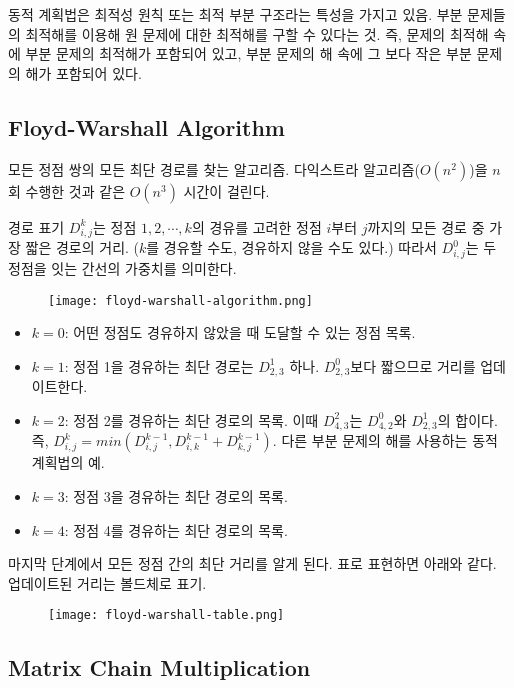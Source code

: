 동적 계획법은 최적성 원칙 또는 최적 부분 구조라는 특성을 가지고 있음. 부분 문제들의 최적해를 이용해 원 문제에 대한 최적해를 구할 수 있다는 것. 즉, 문제의 최적해 속에 부분 문제의 최적해가 포함되어 있고, 부분 문제의 해 속에 그 보다 작은 부분 문제의 해가 포함되어 있다.

\subsection{Floyd-Warshall Algorithm}

모든 정점 쌍의 모든 최단 경로를 찾는 알고리즘. 다익스트라 알고리즘($O(n^2)$)을 $n$회 수행한 것과 같은 $O(n^3)$ 시간이 걸린다.

경로 표기 $D_{i,j}^k$는 정점 $1, 2, \cdots, k$의 경유를 고려한 정점 $i$부터 $j$까지의 모든 경로 중 가장 짧은 경로의 거리. ($k$를 경유할 수도, 경유하지 않을 수도 있다.) 따라서 $D_{i,j}^0$는 두 정점을 잇는 간선의 가중치를 의미한다.

\begin{figure}[h]
  \centering
  \texttt{[image: floyd-warshall-algorithm.png]}
\end{figure}

\begin{itemize}
  \item $k = 0$: 어떤 정점도 경유하지 않았을 때 도달할 수 있는 정점 목록.
  \item $k = 1$: 정점 1을 경유하는 최단 경로는 $D_{2,3}^1$ 하나. $D_{2,3}^0$보다 짧으므로 거리를 업데이트한다.
  \item $k = 2$: 정점 2를 경유하는 최단 경로의 목록. 이때 $D_{4,3}^2$는 $D_{4,2}^0$와 $D_{2,3}^1$의 합이다. 즉, $D_{i,j}^k = min(D_{i,j}^{k - 1}, D_{i,k}^{k - 1} + D_{k,j}^{k - 1})$. 다른 부분 문제의 해를 사용하는 동적 계획법의 예.
  \item $k = 3$: 정점 3을 경유하는 최단 경로의 목록.
  \item $k = 4$: 정점 4를 경유하는 최단 경로의 목록.
\end{itemize}

마지막 단계에서 모든 정점 간의 최단 거리를 알게 된다. 표로 표현하면 아래와 같다. 업데이트된 거리는 볼드체로 표기.

\begin{figure}[h]
  \centering
  \texttt{[image: floyd-warshall-table.png]}
\end{figure}

\subsection{Matrix Chain Multiplication}

